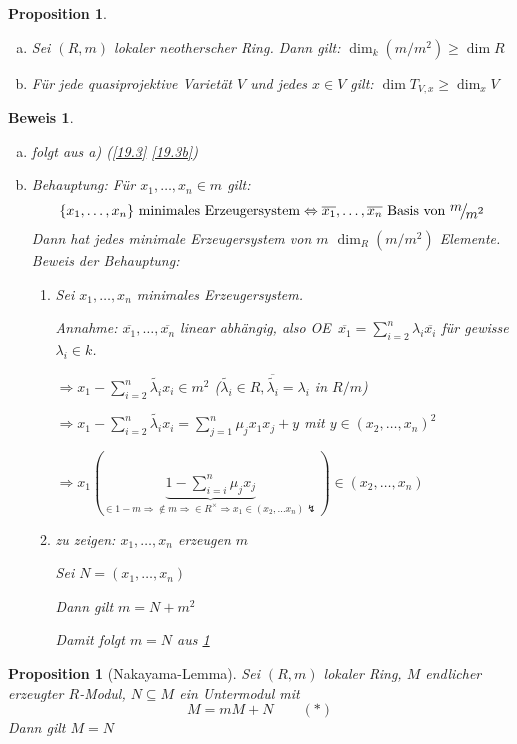 \documentclass[a4paper, 12pt, numbers=noendperiod, chapterprefix=true, headsepline]{scrbook}
\theoremstyle{break}
\newtheorem{Prop}[Def]{Proposition}
\theoremstyle{nonumberbreak}
\newtheorem{Bew}{Beweis}
\theoremstyle{nonumberplain}
\newcommand{\quot}[1]{\textrm{\glqq}{#1}\textrm{\grqq}}
\newcommand{\Sum}{\sum\limits}
\newenvironment{twosidedproof}{\begin{enumerate}[\quot{$\Rightarrow$}:]}{\end{enumerate}}
\newcommand{\proofforward}{\item[\quot{$\Rightarrow$}:]}
\newcommand{\proofreverse}{\item[\quot{$\Leftarrow$}:]}
\newcommand{\FakRaum}[2]{
  \raisebox{0.7ex}{\ensuremath{#1}}
  \ensuremath{\mkern-3mu}\big/\ensuremath{\mkern-3mu}
  \raisebox{-0.6ex}{\ensuremath{#2}}}
\renewcommand{\OE}{O\!\!E~}
\begin{document}
\begin{Prop}\label{19.4}\begin{enumerate}[a)]
\item
	Sei $(R,m)$ lokaler neotherscher Ring. Dann gilt: $\dim_k(m/m^2)\ge\dim R$
\item
	F\"ur jede quasiprojektive Variet\"at $V$ und jedes $x\in V$ gilt: $\dim T_{V,x}\ge\dim_xV$
\end{enumerate}\end{Prop}

\begin{Bew}\begin{enumerate}[a)]
\item[b)]
	folgt aus a) (\ref{19.3} \ref{19.3b})
\item[a)]
	\emph{Behauptung:} F\"ur $x_1,\ldots ,x_n\in m$ gilt:
		\[\{x_1,\ldots ,x_n\} \text{ minimales Erzeugersystem} \Leftrightarrow \overline{x_1},\ldots ,\overline{x_n} \text{ Basis von } \FakRaum{m}{m^2}\]
	Dann hat jedes minimale Erzeugersystem von $m$ $\dim_R(m/m^2)$ Elemente.\\
	\emph{Beweis der Behauptung:}\begin{twosidedproof}
	\proofforward
		Sei $x_1,\ldots ,x_n$ minimales Erzeugersystem.
		
		\emph{Annahme:} $\overline{x_1},\ldots ,\overline{x_n}$ linear abh\"angig, also \OE $\overline{x_1}=\Sum_{i=2}^n\lambda_i\overline{x_i}$ f\"ur gewisse $\lambda_i\in k$.
		
		$\Rightarrow x_1-\Sum_{i=2}^n\tilde{\lambda_i}x_i\in m^2$ ($\tilde{\lambda_i}\in R, \overline{\tilde{\lambda_i}}=\lambda_i$ in $R/m$)
		
		$\Rightarrow x_1-\Sum_{i=2}^n\tilde{\lambda_i}x_i = \Sum_{j=1}^n\mu_jx_1x_j+y$ mit $y\in(x_2,\ldots ,x_n)^2$
		
		$\Rightarrow x_1(\underbrace{1-\Sum_{i=i}^n\mu_jx_j}_{\in 1-m \Rightarrow \notin m \Rightarrow \in R^\times \Rightarrow x_1 \in (x_2,\ldots x_n) \lightning})\in (x_2,\ldots ,x_n)$
	\proofreverse
		\emph{zu zeigen:} $x_1,\ldots ,x_n$ erzeugen $m$
		
		Sei $N=(x_1,\ldots ,x_n)$
		
		Dann gilt $m=N+m^2$
		
		Damit folgt $m=N$ aus \ref{19.5}
	\end{twosidedproof}
\end{enumerate}\end{Bew}

\begin{Prop}[Nakayama-Lemma]\label{19.5}
Sei $(R,m)$ lokaler Ring, $M$ endlicher erzeugter $R$-Modul, $N\subseteq M$ ein Untermodul mit
	\[M=mM+N \qquad (*)\]
Dann gilt $M=N$
\end{Prop}
\end{document}
